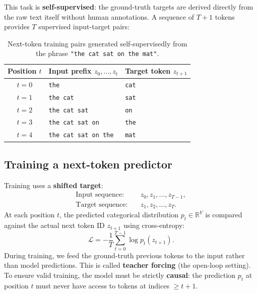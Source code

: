 \documentclass[11pt,a4paper]{article}
\newcommand{\R}{\mathbb{R}}
\newcommand{\slides}[1]{\par\nopagebreak\noindent{\normalfont\small\emph{(slides #1)}}\par\nopagebreak\vspace{2pt}}
\theoremstyle{definition}
\theoremstyle{plain}
\begin{document}
This task is \textbf{self-supervised}: the ground-truth targets are derived directly from the raw text itself without human annotations. A sequence of $T+1$ tokens provides $T$ supervised input-target pairs:

\begin{table}[H]
\centering\small
\begin{tabular}{@{}cll@{}}
\toprule
\textbf{Position $t$} & \textbf{Input prefix} $z_0, \dots, z_t$ & \textbf{Target token} $z_{t+1}$ \\
\midrule
$t=0$ & \texttt{the} & \texttt{cat} \\
$t=1$ & \texttt{the cat} & \texttt{sat} \\
$t=2$ & \texttt{the cat sat} & \texttt{on} \\
$t=3$ & \texttt{the cat sat on} & \texttt{the} \\
$t=4$ & \texttt{the cat sat on the} & \texttt{mat} \\
\bottomrule
\end{tabular}
\caption{Next-token training pairs generated self-supervisedly from the phrase \texttt{"the cat sat on the mat"}.}\label{tab:next_token}
\end{table}

\subsection{Training a next-token predictor}\slides{12 / 84}
Training uses a \textbf{shifted target}:
\begin{equation}
\begin{aligned}
\text{Input sequence:} &\quad z_0, z_1, \dots, z_{T-1}, \\
\text{Target sequence:} &\quad z_1, z_2, \dots, z_T.
\end{aligned}
\end{equation}
At each position $t$, the predicted categorical distribution $p_t \in \R^V$ is compared against the actual next token ID $z_{t+1}$ using cross-entropy:
\begin{equation}\label{eq:lm_loss}
\mathcal{L} = -\frac{1}{T} \sum_{t=0}^{T-1} \log p_t(z_{t+1}).
\end{equation}
During training, we feed the ground-truth previous tokens to the input rather than model predictions. This is called \textbf{teacher forcing} (the open-loop setting). To ensure valid training, the model must be strictly \textbf{causal}: the prediction $p_t$ at position $t$ must never have access to tokens at indices $\ge t+1$.
\end{document}
